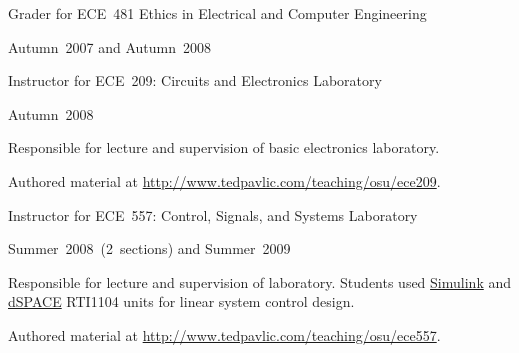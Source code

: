 \documentclass[10pt]{article}
\newcommand{\halfblankline}{\quad\vspace{-0.5\baselineskip}\pagebreak[3]}
\begin{document}
\begin{outerlist}
\begin{innerlist}
        \halfblankline

        \item Grader for ECE~481 Ethics in Electrical and Computer Engineering
        \begin{innerlist}
            \item Autumn~2007 and Autumn~2008
        \end{innerlist}

        \halfblankline

        \item Instructor for ECE~209: Circuits and Electronics
            Laboratory
        \begin{innerlist}
            \item Autumn~2008


            \item Responsible for lecture and supervision of basic
                electronics laboratory.

            \item Authored material at
                \url{http://www.tedpavlic.com/teaching/osu/ece209}.
        \end{innerlist}

        \halfblankline

        \item Instructor for ECE~557: Control, Signals, and Systems
            Laboratory
        \begin{innerlist}
            \item Summer~2008~(2~sections) and Summer~2009


            \item Responsible for lecture and supervision of laboratory.
                Students used
                \href{http://www.mathworks.com/products/simulink/}{Simulink}
                and \href{http://www.dspaceinc.com/}{dSPACE} RTI1104
                units for linear system control design.

            \item Authored material at
                \url{http://www.tedpavlic.com/teaching/osu/ece557}.
        \end{innerlist}

        \halfblankline


\end{innerlist}
\end{outerlist}
\end{document}
